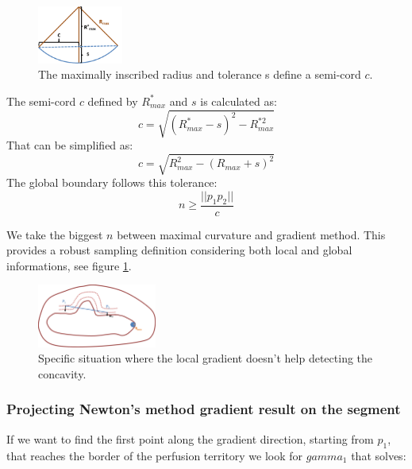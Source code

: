 \documentclass[11pt,a4paper]{article}
\begin{document}
\begin{figure}[h!]
			\centering
			\includegraphics[width=0.25\textwidth]{Drawings/CurvatureTolerance.png}
			\caption{The maximally inscribed radius and tolerance s define a semi-cord $c$.}
\end{figure}

The semi-cord $c$ defined by $R_{max}^*$ and $s$ is calculated as:
\begin{equation}
c = \sqrt{(R_{max}^*-s)^2 - R_{max}^{*2}}
\end{equation} 
That can be simplified as:
\begin{equation}
c = \sqrt{R_{max}^2 - (R_{max} + s)^2}
\end{equation}
The global boundary follows this tolerance:
\begin{equation}
n \geq \frac{||p_1p_2||}{c}
\end{equation}

We take the biggest $n$ between maximal curvature and gradient method. This provides a robust sampling definition considering both local and global informations, see figure \ref{test sampling}.
\begin{figure}[h!]
			\label{test sampling}
			\centering
			\includegraphics[width=0.35\textwidth]{Drawings/CurvatureTestExample2.png}
			\caption{Specific situation where the local gradient doesn't help detecting the concavity.}
\end{figure}

\subsubsection{Projecting Newton's method gradient result on the segment}


If we want to find the first point along the gradient direction, starting from $p_1$, that reaches the border of the perfusion territory we look for $gamma_1$ that solves:
\end{document}
